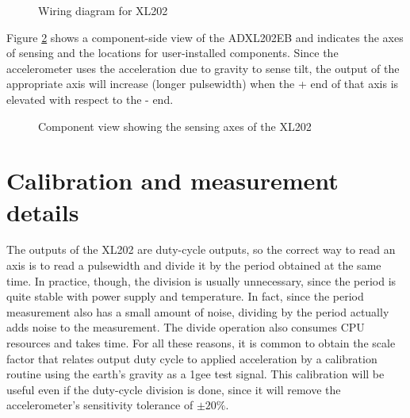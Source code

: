
\epsfysize=2.0in
\begin{figure}[htbp]
\begin{center}
\caption{Wiring diagram for XL202}
\label{XLwiring}
\end{center}
\end{figure}


Figure \ref{sensingaxes} shows a component-side view of the ADXL202EB
and indicates 
the axes of sensing and the locations for user-installed components.
Since the accelerometer uses the acceleration due to gravity to sense
tilt, the output of the appropriate axis will increase (longer
pulsewidth) when the + end of that axis is elevated with respect to
the - end.

\epsfysize=2.0in
\begin{figure}[htbp]
\begin{center}
\caption{Component view showing the sensing axes of the XL202}
\label{sensingaxes}
\end{center}
\end{figure}


\section{Calibration and measurement details}

The outputs of the XL202 are duty-cycle outputs, so the correct way to
read an axis is to read a pulsewidth and divide it by the period
obtained at the same time.  In practice, though, the division is
usually unnecessary, since the period is quite stable with power
supply and temperature.  In fact, since the period measurement also
has a small amount of noise, dividing by the period actually adds
noise to the measurement.  The divide operation also consumes CPU
resources and takes time.  For all these reasons, it is common to
obtain the scale factor that relates output duty cycle to applied
acceleration by a calibration routine using the earth's gravity as a
1gee test signal.  This calibration will be useful even if the
duty-cycle division is done, since it will remove the accelerometer's
sensitivity tolerance of $\pm 20\%$. 

